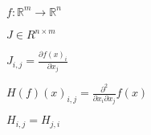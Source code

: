 \documentclass{article}
\begin{document}
	
	$\mathit{f} : \mathbb{R}^{m} \to \mathbb{R}^{n}$
	
	$\mathit{J} \in R^{n \times m}$
	
	
	$\mathit{J}_{i,j} = \frac{\partial f(x)_{i}}{\partial x_{j}}$
	
	$H(f)(x)_{i,j} = \frac{\partial^2}{\partial{x_{i}} \partial{x_{j}}}f(x)$
	
	$H_{i,j} = H_{j,i}$
\end{document}
